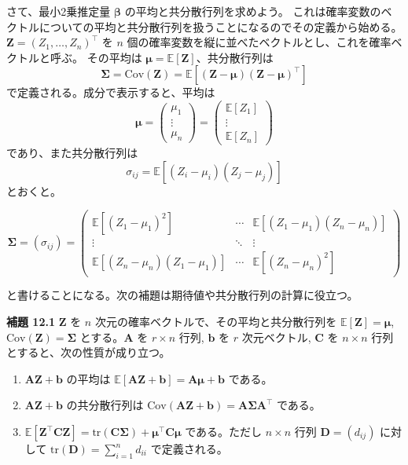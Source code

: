 \documentclass{article}
\begin{document}
さて、最小2乗推定量 $\bm{\beta}$ の平均と共分散行列を求めよう。
これは確率変数のベクトルについての平均と共分散行列を扱うことになるのでその定義から始める。
$\bm{Z} = (Z_1, \ldots, Z_n)^\top$ を $n$ 個の確率変数を縦に並べたベクトルとし、これを確率ベクトルと呼ぶ。
その平均は $\bm{\mu} = \mathbb{E}[\bm{Z}]$、共分散行列は
\[
\bm{\Sigma} = \mathrm{Cov}(\bm{Z}) = \mathbb{E}[(\bm{Z} - \bm{\mu})(\bm{Z} - \bm{\mu})^\top]
\]
で定義される。成分で表示すると、平均は
\[
\bm{\mu} =
\begin{pmatrix}
\mu_1 \\
\vdots \\
\mu_n
\end{pmatrix}
=
\begin{pmatrix}
\mathbb{E}[Z_1] \\
\vdots \\
\mathbb{E}[Z_n]
\end{pmatrix}
\]
であり、また共分散行列は
\[
\sigma_{ij} = \mathbb{E}[(Z_i - \mu_i)(Z_j - \mu_j)]
\]
とおくと。


\[
\bm{\Sigma} = (\sigma_{ij}) =
\begin{pmatrix}
\mathbb{E}[(Z_1 - \mu_1)^2] & \cdots & \mathbb{E}[(Z_1 - \mu_1)(Z_n - \mu_n)] \\
\vdots & \ddots & \vdots \\
\mathbb{E}[(Z_n - \mu_n)(Z_1 - \mu_1)] & \cdots & \mathbb{E}[(Z_n - \mu_n)^2]
\end{pmatrix}
\]

と書けることになる。次の補題は期待値や共分散行列の計算に役立つ。

\bigskip

\noindent
\textbf{補題 12.1} $\bm{Z}$ を $n$ 次元の確率ベクトルで、その平均と共分散行列を $\mathbb{E}[\bm{Z}] = \bm{\mu}$, $\mathrm{Cov}(\bm{Z}) = \bm{\Sigma}$ とする。$\bm{A}$ を $r \times n$ 行列, $\bm{b}$ を $r$ 次元ベクトル, $\bm{C}$ を $n \times n$ 行列とすると、次の性質が成り立つ。

\begin{enumerate}
    \item $\bm{A}\bm{Z} + \bm{b}$ の平均は $\mathbb{E}[\bm{A}\bm{Z} + \bm{b}] = \bm{A}\bm{\mu} + \bm{b}$ である。
    \item $\bm{A}\bm{Z} + \bm{b}$ の共分散行列は $\mathrm{Cov}(\bm{A}\bm{Z} + \bm{b}) = \bm{A}\bm{\Sigma}\bm{A}^\top$ である。
    \item $\mathbb{E}[\bm{Z}^\top \bm{C} \bm{Z}] = \mathrm{tr}(\bm{C}\bm{\Sigma}) + \bm{\mu}^\top \bm{C} \bm{\mu}$ である。ただし $n \times n$ 行列 $\bm{D} = (d_{ij})$ に対して $\mathrm{tr}(\bm{D}) = \sum_{i=1}^n d_{ii}$ で定義される。
\end{enumerate}
\end{document}
